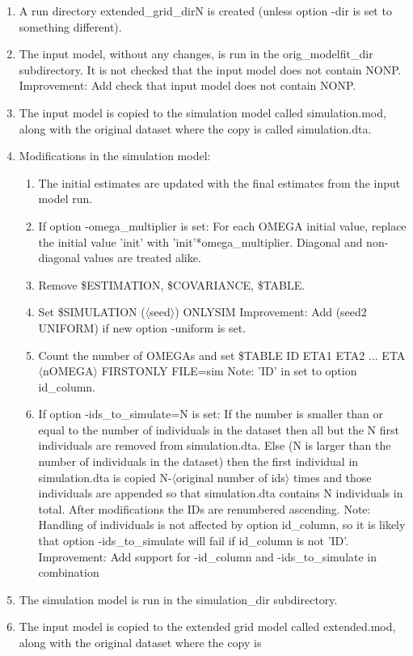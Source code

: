 \begin{enumerate}
\item A run directory extended\_grid\_dirN is created (unless option -dir is set to something different).
\item The input model, without any changes, is run in the orig\_modelfit\_dir subdirectory. It is not checked that 
the input model does not contain NONP. Improvement: Add check that input model does not contain NONP.
\item The input model is copied to the simulation model called simulation.mod, along with the original dataset 
where the copy is called simulation.dta. 
\item Modifications in the simulation model:
	\begin{enumerate}
		\item The initial estimates are updated with the final estimates from the input model run.
		\item If option -omega\_multiplier is set: For each OMEGA initial value, replace the initial value 'init' with 
		'init'*omega\_multiplier. Diagonal and non-diagonal values are treated alike. 
		\item Remove \$ESTIMATION, \$COVARIANCE, \$TABLE.
		\item Set \$SIMULATION ($\langle$seed$\rangle$) ONLYSIM
Improvement: Add (seed2 UNIFORM) if new option -uniform is set.
		\item Count the number of OMEGAs and set 
\$TABLE ID ETA1 ETA2 ... ETA$\langle$nOMEGA$\rangle$ FIRSTONLY FILE=sim
Note: 'ID' in set to option id\_column.
		\item If option -ids\_to\_simulate=N is set: If the number is smaller than or equal to the number of individuals 
		in the dataset then all but the N first individuals are removed from simulation.dta. Else (N is larger than the 
		number of individuals in the dataset) then the first individual in simulation.dta is copied N-$\langle$original 
		number of ids$\rangle$ times and those individuals are appended so that simulation.dta contains N individuals 
		in total. After modifications the IDs are renumbered ascending.
Note: Handling of individuals is not affected by option id\_column, so it is likely that option -ids\_to\_simulate will fail if id\_column is not 'ID'. 
Improvement: Add support for -id\_column and -ids\_to\_simulate in combination
	\end{enumerate}
\item The simulation model is run in the simulation\_dir subdirectory.
\item The input model is copied to the extended grid model called extended.mod, along with the original dataset where the copy is 

\end{enumerate}
